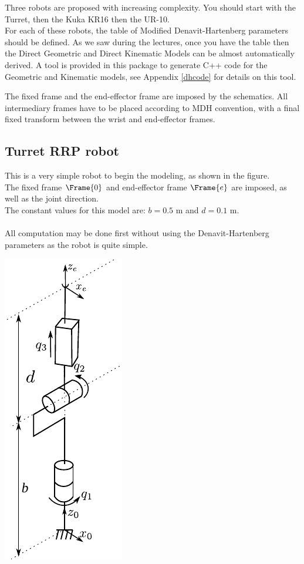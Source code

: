 \documentclass{ecnreport}
\begin{document}
  \def\wMe{{}^w\M_e}
  
  Three robots are proposed with increasing complexity. You should start with the Turret, then the Kuka KR16 then the UR-10.\\
  For each of these robots, the table of Modified Denavit-Hartenberg parameters should be defined. As we saw during the lectures, once you have the table then the Direct Geometric and Direct Kinematic Models can be almost automatically derived. A tool is provided in this package to generate C++ code for the Geometric and Kinematic models, see Appendix \ref{dhcode} for details on this tool.
  
  The fixed frame and the end-effector frame are imposed by the schematics. 
  All intermediary frames have to be placed according to MDH convention, with a final fixed transform between the wrist and end-effector frames.
  
  \subsection{Turret RRP robot}
  
  \begin{minipage}{.8\linewidth}
    This is a very simple robot to begin the modeling, as shown in the figure.\\
    The fixed frame $\Frame{0}$ and end-effector frame $\Frame{e}$ are imposed, as well as the joint direction.\\
    The constant values for this model are: $b = 0.5$ m and $d = 0.1$ m.\\~\\
    All computation may be done first without using the Denavit-Hartenberg parameters as the robot is quite simple. 
  \end{minipage}
  \begin{minipage}{.2\linewidth}
    \includegraphics{fig/turret}\label{turret}
  \end{minipage}
  
\end{document}
